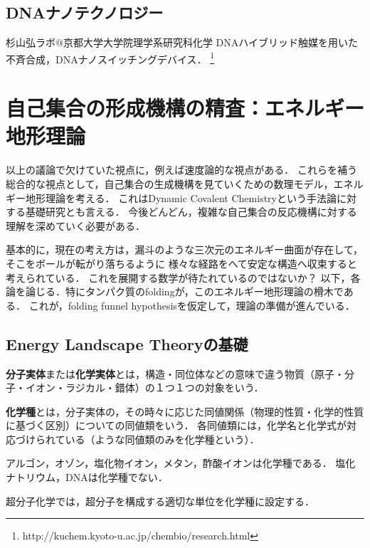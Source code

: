 \documentclass[uplatex, dvipdfmx]{jsreport}
\begin{document}
\subsection{DNAナノテクノロジー}
杉山弘ラボ@京都大学大学院理学系研究科化学
DNAハイブリッド触媒を用いた不斉合成，DNAナノスイッチングデバイス．
\footnote{http://kuchem.kyoto-u.ac.jp/chembio/research.html}

\section{自己集合の形成機構の精査：エネルギー地形理論}
以上の議論で欠けていた視点に，例えば速度論的な視点がある．
これらを補う総合的な視点として，自己集合の生成機構を見ていくための数理モデル，エネルギー地形理論を考える．
これはDynamic Covalent Chemistryという手法論に対する基礎研究とも言える．
今後どんどん，複雑な自己集合の反応機構に対する理解を深めていく必要がある．

基本的に，現在の考え方は，漏斗のような三次元のエネルギー曲面が存在して，そこをボールが転がり落ちるように
様々な経路をへて安定な構造へ収束すると考えられている．
これを展開する数学が待たれているのではないか？
以下，各論を論じる．特にタンパク質のfoldingが，このエネルギー地形理論の榾木である．
これが，folding funnel hypothesisを仮定して，理論の準備が進んでいる．

\subsection{Energy Landscape Theoryの基礎}

\begin{definition}
    \textbf{分子実体}または\textbf{化学実体}とは，構造・同位体などの意味で違う物質（原子・分子・イオン・ラジカル・錯体）の１つ１つの対象をいう．
\end{definition}
\begin{definition}
    \textbf{化学種}とは，分子実体の，その時々に応じた同値関係（物理的性質・化学的性質に基づく区別）についての同値類をいう．
    各同値類には，化学名と化学式が対応づけられている（ような同値類のみを化学種という）．
\end{definition}
\begin{example}
    アルゴン，オゾン，塩化物イオン，メタン，酢酸イオンは化学種である．
    塩化ナトリウム，DNAは化学種でない．
\end{example}
\begin{example}
    超分子化学では，超分子を構成する適切な単位を化学種に設定する．
\end{example}
\end{document}
